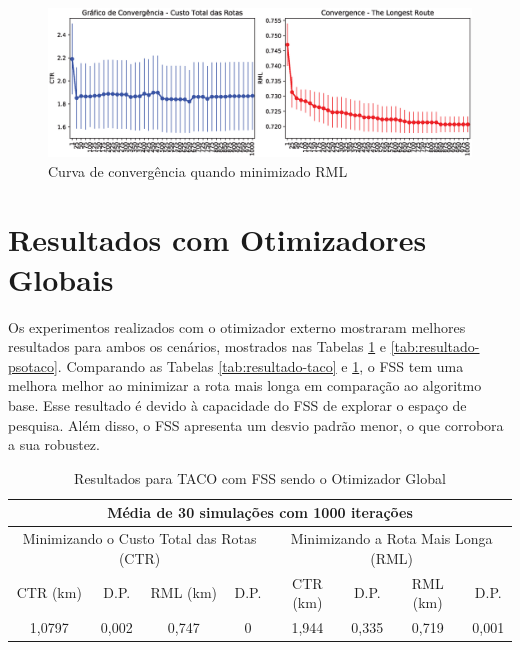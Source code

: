 \begin{figure}[htb]
    \centering
    \caption{Curva de convergência quando minimizado RML} \label{fig:resultados-convergencia-taco-rml}
    \includegraphics[width=\textwidth]{imagens/convergence-maxcost-taco.eps}
\end{figure}

\section{Resultados com Otimizadores Globais}
\label{sec-resultados-fss-pso}

Os experimentos realizados com o otimizador externo mostraram melhores resultados para ambos os cenários, mostrados nas Tabelas \ref{tab:resultado-fsstaco} e \ref{tab:resultado-psotaco}. Comparando as Tabelas \ref{tab:resultado-taco} e \ref{tab:resultado-fsstaco}, o FSS tem uma melhora melhor ao minimizar a rota mais longa em comparação ao algoritmo base. Esse resultado é devido à capacidade do FSS de explorar o espaço de pesquisa. Além disso, o FSS apresenta um desvio padrão menor, o que corrobora a sua robustez.

\begin{table}[htb]
    \centering
    \caption{Resultados para TACO com FSS sendo o Otimizador Global} \label{tab:resultado-fsstaco}
\begin{tabular}{|c|c|c|c|c|c|c|c|}
\hline
\multicolumn{8}{|c|}{Média de 30 simulações com 1000 iterações}                                                            \\ \hline
\multicolumn{4}{|c|}{Minimizando o Custo Total das Rotas (CTR)} & \multicolumn{4}{c|}{Minimizando a Rota Mais Longa (RML)} \\ \hline
CTR (km)    & D.P.   & RML (km)  & D.P.  & CTR (km)  & D.P.     & RML (km)  & D.P.        \\ \hline
1,0797      & 0,002  & 0,747     & 0     & 1,944     & 0,335    & 0,719     & 0,001       \\ \hline
\end{tabular}
\end{table}

